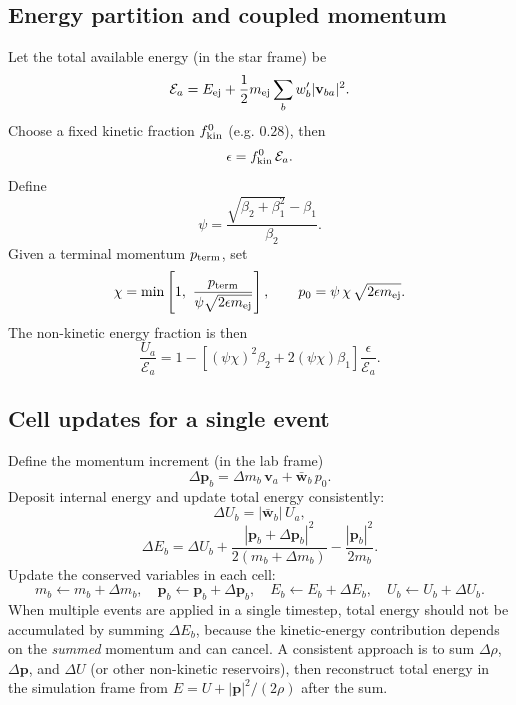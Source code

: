 \documentclass[11pt]{article}
\begin{document}
\subsection{Energy partition and coupled momentum}
Let the total available energy (in the star frame) be
\begin{equation}
\mathcal E_{a} = E_{\rm ej} + \frac{1}{2}m_{\rm ej}\sum_{b} w^{\prime}_{b} |\mathbf v_{ba}|^{2}.
\end{equation}
Choose a fixed kinetic fraction $f_{\rm kin}^{0}$ (e.g. $0.28$), then
\begin{equation}
\epsilon = f_{\rm kin}^{0}\,\mathcal E_{a}.
\end{equation}
Define
\begin{equation}
\psi = \frac{\sqrt{\beta_{2} + \beta_{1}^{2}} - \beta_{1}}{\beta_{2}}.
\end{equation}
Given a terminal momentum $p_{\rm term}$, set
\begin{equation}
\chi = \min\left[1,\ \frac{p_{\rm term}}{\psi \sqrt{2\epsilon m_{\rm ej}}}\right], \qquad
p_{0} = \psi\,\chi\,\sqrt{2\epsilon m_{\rm ej}}.
\end{equation}
The non-kinetic energy fraction is then
\begin{equation}
\frac{U_{a}}{\mathcal E_{a}} =
1 - \left[(\psi\chi)^{2}\beta_{2} + 2(\psi\chi)\beta_{1}\right]\frac{\epsilon}{\mathcal E_{a}}.
\end{equation}

\subsection{Cell updates for a single event}
Define the momentum increment (in the lab frame)
\begin{equation}
\Delta \mathbf p_{b} = \Delta m_{b}\,\mathbf v_{a} + \bar{\mathbf w}_{b}\,p_{0}.
\end{equation}
Deposit internal energy and update total energy consistently:
\begin{equation}
\Delta U_{b} = |\bar{\mathbf w}_{b}|\,U_{a},
\end{equation}
\begin{equation}
\Delta E_{b} = \Delta U_{b}
 + \frac{|\mathbf p_{b}+\Delta \mathbf p_{b}|^{2}}{2(m_{b}+\Delta m_{b})}
 - \frac{|\mathbf p_{b}|^{2}}{2m_{b}}.
\end{equation}
Update the conserved variables in each cell:
\begin{equation}
m_{b} \leftarrow m_{b} + \Delta m_{b},\quad
\mathbf p_{b} \leftarrow \mathbf p_{b} + \Delta \mathbf p_{b},\quad
E_{b} \leftarrow E_{b} + \Delta E_{b},\quad
U_{b} \leftarrow U_{b} + \Delta U_{b}.
\end{equation}
When multiple events are applied in a single timestep, total energy should not
be accumulated by summing $\Delta E_{b}$, because the kinetic-energy contribution
depends on the \emph{summed} momentum and can cancel. A consistent approach is to
sum $\Delta \rho$, $\Delta \mathbf p$, and $\Delta U$ (or other non-kinetic
reservoirs), then reconstruct total energy in the simulation frame from
$E=U+|\mathbf p|^{2}/(2\rho)$ after the sum.
\end{document}
